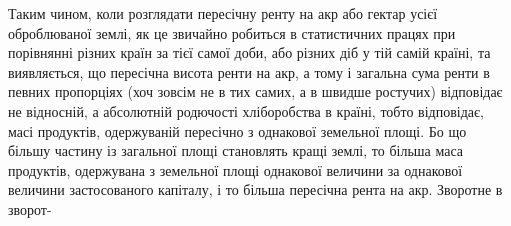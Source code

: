 Таким чином, коли розглядати пересічну ренту на акр або гектар усієї
оброблюваної землі, як це звичайно робиться в статистичних працях при порівнянні
різних країн за тієї самої доби, або різних діб у тій самій країні, та
виявляється, що пересічна висота ренти на акр, а тому і загальна сума ренти
в певних пропорціях (хоч зовсім не в тих самих, а в швидше ростучих) відповідає
не відносній, а абсолютній родючості хліборобства в країні, тобто відповідає,
масі продуктів, одержуваній пересічно з однакової земельної площі. Бо що
більшу частину із загальної площі становлять кращі землі, то більша маса
продуктів, одержувана з земельної площі однакової величини за однакової величини
застосованого капіталу, і то більша пересічна рента на акр. Зворотне в зворот-
